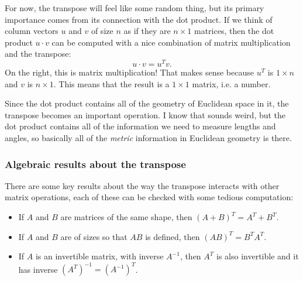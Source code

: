 \documentclass[10pt,]{book}
\theoremstyle{plain}
\theoremstyle{definition}
\numberwithin{equation}{section}
\begin{document}
      For now, the transpose will feel like some random thing, but its primary
      importance comes from its connection with the dot product. If we think of
      column vectors \(u\) and \(v\) of size \(n\) as if they are \(n \times 1\)
      matrices, then the dot product \(u \cdot v\) can be computed with a nice
      combination of matrix multiplication and the transpose:
      \[
      u \cdot v = u^T v .
      \]
      On the right, this is matrix multiplication! That makes sense because
      \(u^T\) is \(1 \times n\) and \(v\) is \(n \times 1\). This
      means that the result
      is a \(1\times 1\) matrix, i.e. a number.
\par

      Since the dot product contains all of the geometry of Euclidean space in
      it, the transpose becomes an important operation. I know that sounds weird,
      but the dot product contains all of the information we need to measure
      lengths and angles, so basically all of the \emph{metric} information in
      Euclidean geometry is there.
\typeout{************************************************}
\typeout{************************************************}
\subsubsection[Algebraic results about the transpose]{Algebraic results about the transpose}\label{subsubsection-29}

        There are some key results about the way the transpose interacts with
        other matrix operations, each of these can be checked with some tedious
        computation:
\begin{itemize}
\item{}
          If \(A\) and \(B\) are matrices of the same shape, then
          \((A+B)^T = A^T + B^T\).
        \item{}
          If \(A\) and \(B\) are of sizes so that \(AB\) is defined,
          then \((AB)^T = B^T A^T\).
        \item{}
          If \(A\) is an invertible matrix, with inverse \(A^{-1}\),
          then \(A^T\) is also invertible and it has inverse
          \(\left(A^T\right)^{-1} = \left(A^{-1}\right)^T \).
        \end{itemize}
\typeout{************************************************}
\typeout{************************************************}
\end{document}
